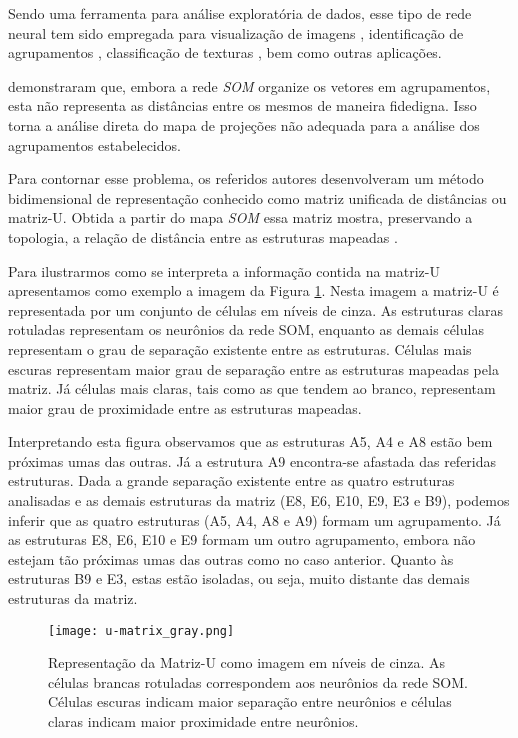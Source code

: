 Sendo uma ferramenta para análise exploratória de dados, esse tipo de rede neural tem sido empregada para visualização de imagens \cite{Strong2011774}, identificação de agrupamentos \cite{Kuroiwa200031}, classificação de texturas \cite{595364}, bem como outras aplicações.

 demonstraram que, embora a rede \emph{SOM} organize os vetores em agrupamentos, esta não representa as distâncias entre os mesmos de maneira fidedigna. Isso torna a análise direta do mapa de projeções não adequada para a análise dos agrupamentos estabelecidos. 

Para contornar esse problema, os referidos autores desenvolveram um método bidimensional de representação conhecido como matriz unificada de distâncias ou matriz-U. Obtida a partir do mapa \emph{SOM} essa matriz mostra, preservando a topologia, a relação de distância entre as estruturas mapeadas \cite{Ultsch:1990}. 

Para ilustrarmos como se interpreta a informação contida na matriz-U apresentamos como exemplo a imagem da Figura \ref{fig:u-matrix}. Nesta imagem a matriz-U é representada por um conjunto de células em níveis de cinza. As estruturas claras rotuladas representam os neurônios da rede SOM, enquanto as demais células representam o grau de separação existente entre as estruturas. Células mais escuras representam maior grau de separação entre as estruturas mapeadas pela matriz. Já células mais claras, tais como as que tendem ao branco, representam maior grau de proximidade entre as estruturas mapeadas. 

Interpretando esta figura observamos que as estruturas A5, A4 e A8 estão bem próximas umas das outras. Já a estrutura A9 encontra-se afastada das referidas estruturas. Dada a grande separação existente entre as quatro estruturas analisadas e as demais estruturas da matriz (E8, E6, E10, E9, E3 e B9), podemos inferir que as quatro estruturas (A5, A4, A8 e A9) formam um agrupamento. Já as estruturas E8, E6, E10 e E9 formam um outro agrupamento, embora não estejam tão próximas umas das outras como no caso anterior. Quanto às estruturas B9 e E3, estas estão isoladas, ou seja, muito distante das demais estruturas da matriz.


\begin{figure}[h!]
  \caption{\label{fig:u-matrix} Representação da Matriz-U como imagem em níveis de cinza. As células brancas rotuladas correspondem aos neurônios da rede SOM. Células escuras indicam maior separação entre neurônios e células claras indicam maior proximidade entre neurônios.}
  \centering
  \texttt{[image: u-matrix\_gray.png]}
\end{figure}


